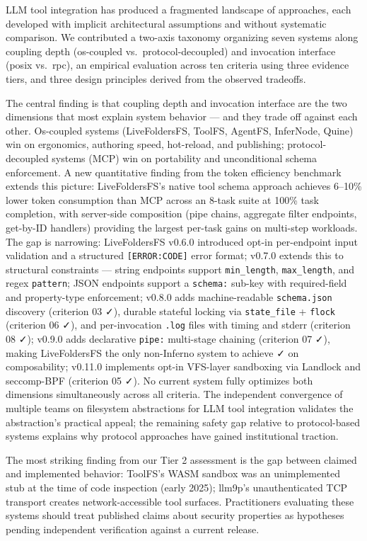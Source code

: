 \documentclass[
  11pt,
]{article}
\begin{document}
LLM tool integration has produced a fragmented landscape of approaches,
each developed with implicit architectural assumptions and without
systematic comparison. We contributed a two-axis taxonomy organizing
seven systems along coupling depth (os-coupled vs.~protocol-decoupled)
and invocation interface (posix vs.~rpc), an empirical evaluation across
ten criteria using three evidence tiers, and three design principles
derived from the observed tradeoffs.

The central finding is that coupling depth and invocation interface are
the two dimensions that most explain system behavior --- and they trade
off against each other. Os-coupled systems (LiveFoldersFS, ToolFS,
AgentFS, InferNode, Quine) win on ergonomics, authoring speed,
hot-reload, and publishing; protocol-decoupled systems (MCP) win on
portability and unconditional schema enforcement. A new quantitative
finding from the token efficiency benchmark extends this picture:
LiveFoldersFS's native tool schema approach achieves 6--10\% lower token
consumption than MCP across an 8-task suite at 100\% task completion,
with server-side composition (pipe chains, aggregate filter endpoints,
get-by-ID handlers) providing the largest per-task gains on multi-step
workloads. The gap is narrowing: LiveFoldersFS v0.6.0 introduced opt-in
per-endpoint input validation and a structured \texttt{{[}ERROR:CODE{]}}
error format; v0.7.0 extends this to structural constraints --- string
endpoints support \texttt{min\_length}, \texttt{max\_length}, and regex
\texttt{pattern}; JSON endpoints support a \texttt{schema:} sub-key with
required-field and property-type enforcement; v0.8.0 adds
machine-readable \texttt{schema.json} discovery (criterion 03 ✓),
durable stateful locking via \texttt{state\_file} + \texttt{flock}
(criterion 06 ✓), and per-invocation \texttt{.log} files with timing and
stderr (criterion 08 ✓); v0.9.0 adds declarative \texttt{pipe:}
multi-stage chaining (criterion 07 ✓), making LiveFoldersFS the only
non-Inferno system to achieve ✓ on composability; v0.11.0 implements
opt-in VFS-layer sandboxing via Landlock and seccomp-BPF (criterion 05
✓). No current system fully optimizes both dimensions simultaneously
across all criteria. The independent convergence of multiple teams on
filesystem abstractions for LLM tool integration validates the
abstraction's practical appeal; the remaining safety gap relative to
protocol-based systems explains why protocol approaches have gained
institutional traction.

The most striking finding from our Tier 2 assessment is the gap between
claimed and implemented behavior: ToolFS's WASM sandbox was an
unimplemented stub at the time of code inspection (early 2025); llm9p's
unauthenticated TCP transport creates network-accessible tool surfaces.
Practitioners evaluating these systems should treat published claims
about security properties as hypotheses pending independent verification
against a current release.
\end{document}
